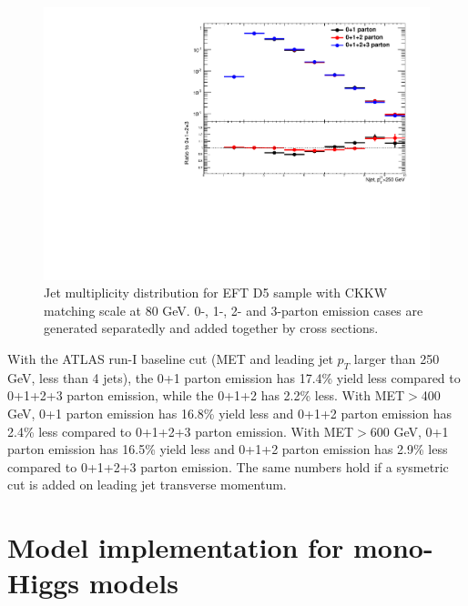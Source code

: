 \begin{figure}[h!]
	\centering  
	\includegraphics[width=0.8\linewidth]{figures/monojet_appendix/h_njet250.pdf}
	\caption{Jet multiplicity distribution for EFT D5 sample with CKKW matching scale at 80 GeV. 0-, 1-, 2- and 3-parton emission cases are generated separatedly and added together by cross sections.}
	\label{fig:RatioKine_D5_2}
\end{figure}

With the ATLAS run-I baseline cut (MET and leading jet $p_{T}$ larger than 250 GeV, less than 4 jets), the 0+1 parton emission has 17.4\% yield less compared to 0+1+2+3 parton emission, while the 0+1+2 has 2.2\% less. With MET$>$400 GeV, 0+1 parton emission has 16.8\% yield less and 0+1+2 parton emission has 2.4\% less compared to 0+1+2+3 parton emission. With MET$>$600 GeV, 0+1 parton emission has 16.5\% yield less and 0+1+2 parton emission has 2.9\% less compared to 0+1+2+3 parton emission. The same numbers hold if a sysmetric cut is added on leading jet transverse momentum.


\section{Model implementation for mono-Higgs models}

